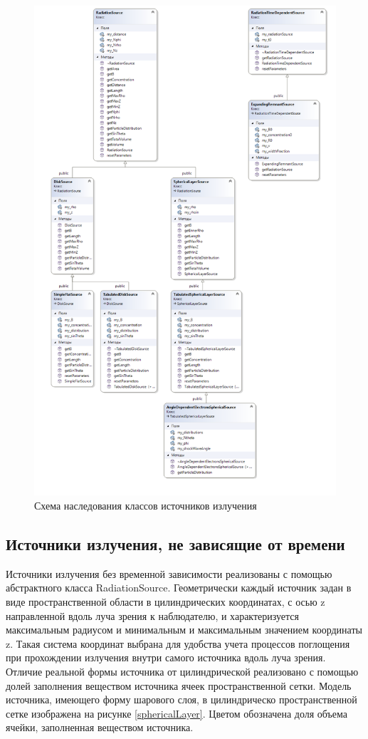\begin{figure}
	\centering
	\includegraphics[width=14.5 cm]{./fig/radiationSource.png} 
	\caption{Схема наследования классов источников излучения}
	\label{radiationSource}
\end{figure}

\subsection{Источники излучения, не зависящие от времени}\label{sourcesSection}
Источники излучения без временной зависимости реализованы с помощью абстрактного класса RadiationSource. Геометрически каждый источник задан в виде пространственной области в цилиндрических координатах, с осью z направленной вдоль луча зрения к наблюдателю, и характеризуется максимальным радиусом и минимальным и максимальным значением координаты z. Такая система координат выбрана для удобства учета процессов поглощения при прохождении излучения внутри самого источника вдоль луча зрения. Отличие реальной формы источника от цилиндрической реализовано с помощью долей заполнения веществом источника ячеек пространственной сетки. Модель источника, имеющего форму шарового слоя, в цилиндрическо пространственной сетке изображена на рисунке \ref{sphericalLayer}. Цветом обозначена доля объема ячейки, заполненная веществом источника.

